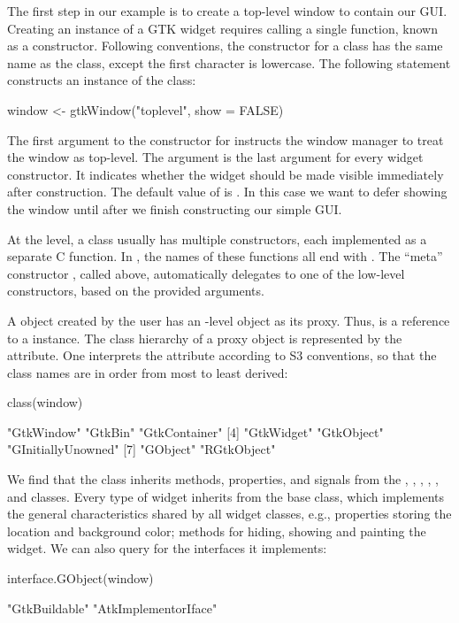 The first step in our example is to create a top-level window to
contain our GUI.  Creating an instance of a GTK\/ widget requires
calling a single \R\/ function, known as a constructor. Following \R\/
conventions, the constructor for a class has the same name as the
class, except the first character is lowercase. The following
statement constructs an instance of the  class:
\begin{Schunk}
\begin{Sinput}
 window <- gtkWindow("toplevel", show = FALSE)
\end{Sinput}
\end{Schunk}
%
The first argument to the constructor for  instructs
the window manager to treat the window as top-level.  The 
argument is the last argument for every widget constructor. It
indicates whether the widget should be made visible immediately after
construction.  The default value of  is . In
this case we want to defer showing the window until after we finish
constructing our simple GUI.

At the \GTK\/ level, a class usually has multiple constructors, each
implemented as a separate C function. In , the names of
these functions all end with . The ``meta'' constructor
, called above, automatically delegates to one of
the low-level constructors, based on the provided arguments.

A \GTK\/ object created by the \R\/ user has an \R-level object as its
proxy. Thus,  is a reference to a 
instance.  The class hierarchy of a proxy object is represented by the
 attribute. One interprets the attribute according to S3
conventions, so that the class names are in order from most to least
derived:
\begin{Schunk}
\begin{Sinput}
 class(window)
\end{Sinput}
\begin{Soutput}
[1] "GtkWindow"         "GtkBin"            "GtkContainer"     
[4] "GtkWidget"         "GtkObject"         "GInitiallyUnowned"
[7] "GObject"           "RGtkObject"       
\end{Soutput}
\end{Schunk}
%
We find that the  class inherits methods,
properties, and signals from the , ,
, , , and
 classes. Every type of  widget inherits from
the base  class, which implements the general
characteristics shared by all widget classes, e.g., properties storing
the location and background color; methods for hiding, showing and
painting the widget. We can also query  for the
interfaces it implements:
\begin{Schunk}
\begin{Sinput}
 interface.GObject(window)
\end{Sinput}
\begin{Soutput}
[1] "GtkBuildable"        "AtkImplementorIface"
\end{Soutput}
\end{Schunk}

